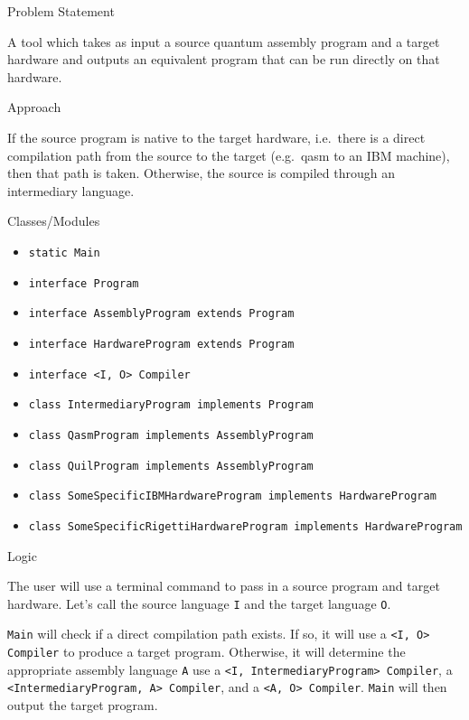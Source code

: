 \documentclass[10pt,letter]{article}
\begin{document}
\begin{section}{Problem Statement}

  A tool which takes as input a source quantum assembly program and a target hardware and outputs an equivalent program that can be run directly on that hardware.

\end{section}

\begin{section}{Approach}

  If the source program is native to the target hardware, i.e.~there is a direct compilation path from the source to the target (e.g.~qasm to an IBM machine), then that path is taken.
  Otherwise, the source is compiled through an intermediary language.

\end{section}

\begin{section}{Classes/Modules}

  \begin{itemize}
  \item \texttt{static Main}
  \item \texttt{interface Program}
  \item \texttt{interface AssemblyProgram extends Program}
  \item \texttt{interface HardwareProgram extends Program}
  \item \texttt{interface <I, O> Compiler}
  \item \texttt{class IntermediaryProgram implements Program}
  \item \texttt{class QasmProgram implements AssemblyProgram}
  \item \texttt{class QuilProgram implements AssemblyProgram}
  \item \texttt{class SomeSpecificIBMHardwareProgram implements HardwareProgram}
  \item \texttt{class SomeSpecificRigettiHardwareProgram implements HardwareProgram}
  \end{itemize}

\end{section}

\begin{section}{Logic}

  The user will use a terminal command to pass in a source program and target hardware.
  Let's call the source language \texttt{I} and the target language \texttt{O}.

  \texttt{Main} will check if a direct compilation path exists.
  If so, it will use a \texttt{<I, O> Compiler} to produce a target program.
  Otherwise, it will determine the appropriate assembly language \texttt{A} use a \texttt{<I, IntermediaryProgram> Compiler}, a \texttt{<IntermediaryProgram, A> Compiler}, and a \texttt{<A, O> Compiler}.
  \texttt{Main} will then output the target program.

\end{section}
\end{document}
